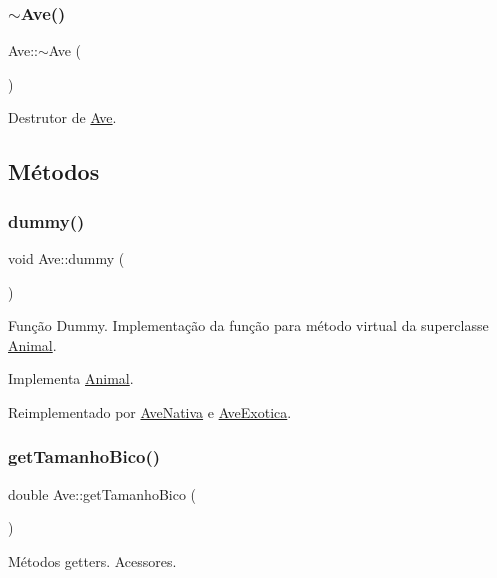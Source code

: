 \subsubsection{\texorpdfstring{$\sim$\+Ave()}{~Ave()}}
{\footnotesize\ttfamily Ave\+::$\sim$\+Ave (\begin{DoxyParamCaption}{ }\end{DoxyParamCaption})}

Destrutor de \hyperlink{classAve}{Ave}. 

\subsection{Métodos}
\mbox{\label{classAve_a9cf98dd6d66c29bc4d8e4f23992ead9c}} 
\subsubsection{\texorpdfstring{dummy()}{dummy()}}
{\footnotesize\ttfamily void Ave\+::dummy (\begin{DoxyParamCaption}{ }\end{DoxyParamCaption})\hspace{0.3cm}{\ttfamily [virtual]}}

Função Dummy. Implementação da função para método virtual da superclasse \hyperlink{classAnimal}{Animal}. 

Implementa \hyperlink{classAnimal_a88fa81bb01530eaa71656b678bf05b5b}{Animal}.



Reimplementado por \hyperlink{classAveNativa_ad4af9772d84390bc0646dcfc9cd931ee}{Ave\+Nativa} e \hyperlink{classAveExotica_add68b24041e28ade517eb42783da81a8}{Ave\+Exotica}.

\mbox{\label{classAve_a2ff747110c5118515b842351e708a0d0}} 
\subsubsection{\texorpdfstring{get\+Tamanho\+Bico()}{getTamanhoBico()}}
{\footnotesize\ttfamily double Ave\+::get\+Tamanho\+Bico (\begin{DoxyParamCaption}{ }\end{DoxyParamCaption})}

Métodos getters. Acessores. \mbox{\label{classAve_a902617014d3400ee315b16599ee0f8ee}} 
